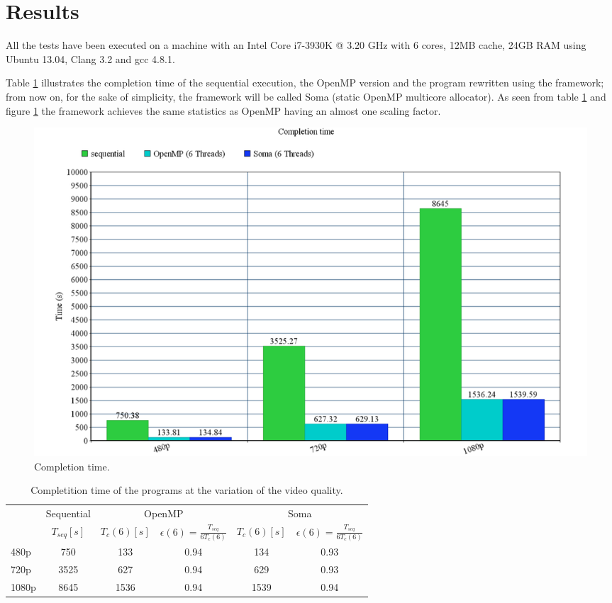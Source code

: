 \documentclass[a4paper,12pt,oneside]{book}
\begin{document}
\section{Results}

All the tests have been executed on a machine with an Intel Core i7-3930K @ 3.20 GHz with 6 cores, 12MB cache, 24GB RAM using Ubuntu 13.04, Clang 3.2 and gcc 4.8.1.

Table \ref{timetable} illustrates the completion time of the sequential execution, the OpenMP version and the program rewritten using the framework; from now on, for the sake of simplicity, the framework will be called Soma (static OpenMP multicore allocator). As seen from table \ref{timetable} and figure \ref{timegraph} the framework achieves the same statistics as OpenMP having an almost one scaling factor.

\begin{figure}[H]
\centering
\includegraphics[scale=0.3]{times.png}
\caption{Completion time.}
\label{timegraph}
\end{figure}

\begin{table}
\begin{center}
\begin{tabular}{| l || c || c | c || c | c |} 
\hline
 & \multicolumn{1}{|c||}{Sequential} & \multicolumn{2}{|c||}{OpenMP} & \multicolumn{2}{|c|}{Soma} \\
\cline{2-6}
  & $T_{seq}[s]$ & $T_c(6)[s]$ & $\epsilon (6) = \frac{T_{seq}}{6T_c(6)}$ & $T_c(6)[s]$ & $\epsilon (6) = \frac{T_{seq}}{6T_c(6)}$ \\
\cline{2-6}
\hline
480p & 750 & 133 & 0.94 & 134 & 0.93 \\
\hline
720p & 3525 & 627 & 0.94 & 629 & 0.93 \\
\hline
1080p & 8645 & 1536 & 0.94 & 1539 & 0.94 \\
\hline 
\end{tabular}
\caption{Completition time of the programs at the variation of the video quality.}
\label{timetable}
\end{center}
\end{table}
\end{document}
